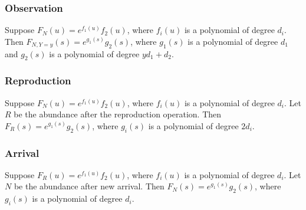 \documentclass{article}
\begin{document}
\subsubsection{Observation}
Suppose $F_N(u) = e^{f_1(u)}f_2(u)$, where $f_i(u)$ is a polynomial of degree $d_i$. Then $F_{N, Y=y}(s) = e^{g_1(s)}g_2(s)$, where $g_1(s)$ is a polynomial of degree $d_1$ and $g_2(s)$ is a polynomial of degree $yd_1+d_2$.

\subsubsection{Reproduction}
Suppose $F_N(u) = e^{f_1(u)}f_2(u)$, where $f_i(u)$ is a polynomial of degree $d_i$. Let $R$ be the abundance after the reproduction operation. Then $F_R(s) = e^{g_1(s)}g_2(s)$, where $g_i(s)$ is a polynomial of degree $2d_i$.

\subsubsection{Arrival}
Suppose $F_R(u) = e^{f_1(u)}f_2(u)$, where $f_i(u)$ is a polynomial of degree $d_i$. Let $N$ be the abundance after new arrival. Then $F_N(s) = e^{g_1(s)}g_2(s)$, where $g_i(s)$ is a polynomial of degree $d_i$.

\medskip
 


\end{document}
